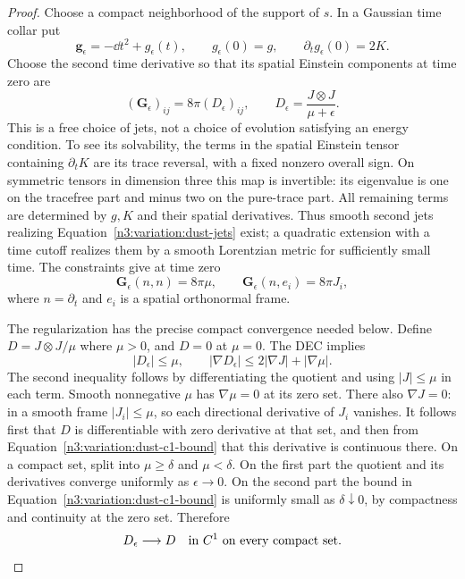 \begin{proof}
Choose a compact neighborhood of the support of $s$.  In a Gaussian
time collar put
\[
 \mathbf g_\epsilon=-\dd t^2+g_\epsilon(t),\qquad
 g_\epsilon(0)=g,\qquad \partial_tg_\epsilon(0)=2K.
\]
Choose the second time derivative so that its spatial Einstein
components at time zero are
\begin{equation}
 (\mathbf G_\epsilon)_{ij}=8\pi(D_\epsilon)_{ij},
 \qquad D_\epsilon=\frac{J\otimes J}{\mu+\epsilon}.
 \label{n3:variation:dust-jets}
\end{equation}
This is a free choice of jets, not a choice of evolution satisfying
an energy condition.  To see its solvability, the terms in the
spatial Einstein tensor containing $\partial_tK$ are its trace
reversal, with a fixed nonzero overall sign.  On symmetric tensors
in dimension three this map is invertible: its eigenvalue is one
on the tracefree part and minus two on the pure-trace part.
All remaining terms are determined by $g,K$ and their spatial
derivatives.  Thus smooth second jets realizing
Equation~\eqref{n3:variation:dust-jets} exist; a quadratic extension
with a time cutoff realizes them by a smooth Lorentzian metric for
sufficiently small time.  The constraints give at time zero
\begin{equation}
 \mathbf G_\epsilon(n,n)=8\pi\mu,
 \qquad \mathbf G_\epsilon(n,e_i)=8\pi J_i,
 \label{n3:variation:gaussian-constraints}
\end{equation}
where $n=\partial_t$ and $e_i$ is a spatial orthonormal frame.

The regularization has the precise compact convergence needed below.
Define $D=J\otimes J/\mu$ where $\mu>0$, and $D=0$ at $\mu=0$.
The DEC implies
\begin{equation}
 |D_\epsilon|\le\mu,\qquad
 |\nabla D_\epsilon|\le2|\nabla J|+|\nabla\mu|.
 \label{n3:variation:dust-c1-bound}
\end{equation}
The second inequality follows by differentiating the quotient and
using $|J|\le\mu$ in each term.  Smooth nonnegative $\mu$ has
$\nabla\mu=0$ at its zero set.  There also $\nabla J=0$:
in a smooth frame $|J_i|\le\mu$, so each directional derivative of
$J_i$ vanishes.  It follows first that $D$ is differentiable with
zero derivative at that set, and then from
Equation~\eqref{n3:variation:dust-c1-bound} that this derivative is
continuous there.  On a compact set, split into $\mu\ge\delta$ and
$\mu<\delta$.  On the first part the quotient and its derivatives
converge uniformly as $\epsilon\to0$.  On the second part the bound
in Equation~\eqref{n3:variation:dust-c1-bound} is uniformly small as
$\delta\downarrow0$, by compactness and continuity at the zero set.
Therefore
\begin{equation}
 D_\epsilon\longrightarrow D\quad\hbox{in }C^1
 \hbox{ on every compact set}.
 \label{n3:variation:dust-c1-convergence}
\end{equation}


\end{proof}

